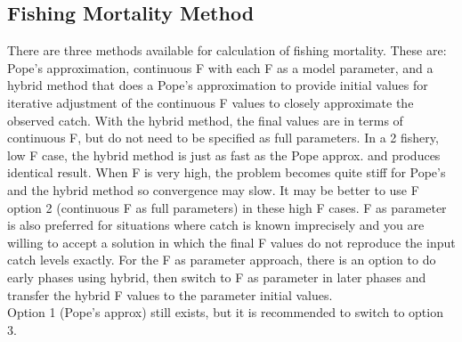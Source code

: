 \subsection{Fishing Mortality Method}
There are  three methods available for calculation of fishing mortality.  These are:  Pope’s approximation, continuous F with each F as a model parameter, and a hybrid method that does a Pope’s approximation to provide initial values for iterative adjustment of the continuous F values to closely approximate the observed catch.  With the hybrid method, the final values are in terms of continuous F, but do not need to be specified as full parameters.  In a 2 fishery, low F case, the hybrid method is just as fast as the Pope approx. and produces identical result.  When F is very high, the problem becomes quite stiff for Pope’s and the hybrid method so convergence may slow.  It may  be better to use F option 2 (continuous F as full parameters) in these high F cases.  F as parameter is also preferred for situations where catch is known imprecisely and you are willing to accept a solution in which the final F values do not reproduce the input catch levels exactly.  For the F as parameter approach, there is an option to do early phases using hybrid, then switch to F as parameter in later phases and transfer the hybrid F values to the parameter initial values.\\
Option 1 (Pope’s approx) still exists, but it is recommended to switch to option 3.


